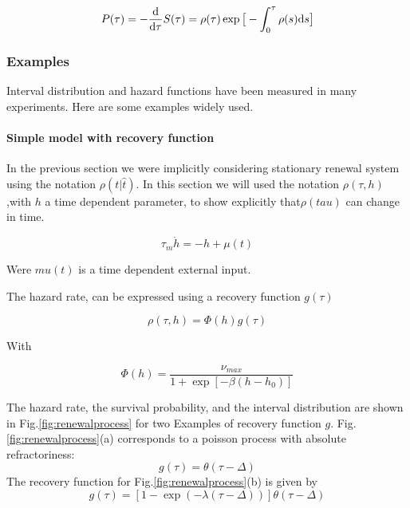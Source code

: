 \documentclass[a4paper,11pt,twoside]{article}
\def \dd  {{\rm d}}
\numberwithin{equation}{section}
\begin{document}
\begin{equation}
\label{eq:P4}
P(\tau)=-\frac{\dd}{\dd \tau}S(\tau)=\rho(\tau)\exp\big[-\int_0^\tau\rho(s)\dd s\big]
\end{equation}



\subsubsection{Examples }
\label{sec:ex}

Interval distribution and hazard functions have been measured in many experiments. Here are some examples widely used.



\paragraph{Simple model with recovery function}

In the previous section we were implicitly considering stationary renewal system using the notation $\rho(t|\hat{t})$. In this section we will used the notation $\rho(\tau,h)$,with $h$ a time dependent parameter, to show explicitly that$\rho(tau)$ can change in time.


\begin{equation}
\label{eq:hi}
\tau_m\dot h=-h+\mu(t)
\end{equation}


Were $mu(t)$ is a time dependent external input.

The hazard rate, can be expressed using a recovery function $g(\tau)$

\begin{equation}
\label{eq:rho}
\rho(\tau,h)=\Phi(h)g(\tau)
\end{equation}

With 

\begin{equation}
\label{eq:phi}
\Phi(h)=\frac{\nu_{max}}{1+\exp[-\beta(h-h_0)]}
\end{equation}

The hazard rate, the survival probability, and the interval distribution are shown in Fig.\ref{fig:renewalprocess} for two Examples of recovery function $g$. Fig.\ref{fig:renewalprocess}(a) corresponds to a poisson process with absolute refractoriness: 
\begin{equation}
\label{eq:poissonabs}
g(\tau)=\theta(\tau-\Delta)
\end{equation}
The recovery function for Fig.\ref{fig:renewalprocess}(b) is given by
\begin{equation}
\label{eq:expabs}
g(\tau)=\left[1-\exp(-\lambda(\tau-\Delta))\right]\theta(\tau-\Delta)
\end{equation}
\end{document}
